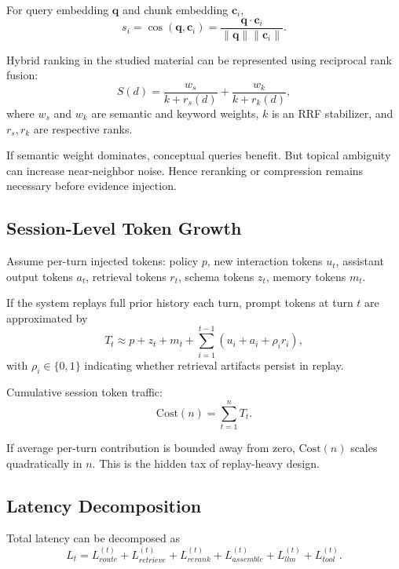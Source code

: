 \documentclass[conference]{IEEEtran}
\begin{document}
For query embedding $\mathbf{q}$ and chunk embedding $\mathbf{c}_i$,
\begin{equation}
s_i = \cos(\mathbf{q},\mathbf{c}_i)=\frac{\mathbf{q}\cdot\mathbf{c}_i}{\|\mathbf{q}\|\|\mathbf{c}_i\|}.
\end{equation}

Hybrid ranking in the studied material can be represented using reciprocal rank fusion:
\begin{equation}
S(d)=\frac{w_s}{k+r_s(d)}+\frac{w_k}{k+r_k(d)},
\label{eq:rrf_math}
\end{equation}
where $w_s$ and $w_k$ are semantic and keyword weights,
$k$ is an RRF stabilizer,
and $r_s,r_k$ are respective ranks.

If semantic weight dominates,
conceptual queries benefit.
But topical ambiguity can increase near-neighbor noise.
Hence reranking or compression remains necessary before evidence injection.

\subsection{Session-Level Token Growth}

Assume per-turn injected tokens:
policy $p$,
new interaction tokens $u_t$,
assistant output tokens $a_t$,
retrieval tokens $r_t$,
schema tokens $z_t$,
memory tokens $m_t$.

If the system replays full prior history each turn,
prompt tokens at turn $t$ are approximated by
\begin{equation}
T_t \approx p + z_t + m_t + \sum_{i=1}^{t-1}(u_i+a_i+\rho_i r_i),
\end{equation}
with $\rho_i\in\{0,1\}$ indicating whether retrieval artifacts persist in replay.

Cumulative session token traffic:
\begin{equation}
\mathrm{Cost}(n)=\sum_{t=1}^{n} T_t.
\end{equation}

If average per-turn contribution is bounded away from zero,
$\mathrm{Cost}(n)$ scales quadratically in $n$.
This is the hidden tax of replay-heavy design.

\subsection{Latency Decomposition}

Total latency can be decomposed as
\begin{equation}
L_t = L^{(t)}_{route} + L^{(t)}_{retrieve} + L^{(t)}_{rerank} + L^{(t)}_{assemble} + L^{(t)}_{llm} + L^{(t)}_{tool}.
\end{equation}
\end{document}
